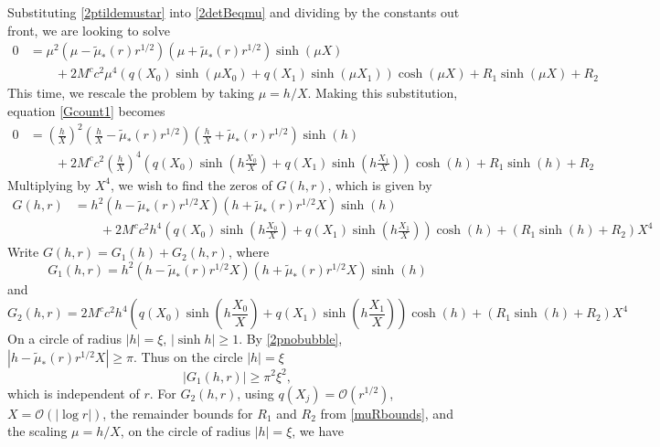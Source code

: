 \documentclass[thesis.tex]{subfiles}
\begin{document}
Substituting \cref{2ptildemustar} into \cref{2detBeqmu} and dividing by the constants out front, we are looking to solve
\begin{equation}\label{Gcount1}
\begin{aligned}
0 &= \mu^2 (\mu - \tilde{\mu}_*(r)r^{1/2}) (\mu + \tilde{\mu}_*(r)r^{1/2}) \sinh(\mu X) \\
&\qquad +2 M^c c^2 \mu^4 ( q(X_0) \sinh(\mu X_0) + q(X_1) \sinh(\mu X_1) ) \cosh(\mu X) + R_1\sinh(\mu X) + R_2
\end{aligned}
\end{equation}
This time, we rescale the problem by taking $\mu = h/X$. Making this substitution, equation \cref{Gcount1} becomes
\begin{equation}\label{Gcount2}
\begin{aligned}
0 &= \left(\frac{h}{X}\right)^2 \left( \frac{h}{X} - \tilde{\mu}_*(r)r^{1/2}\right)\left(\frac{h}{X} + \tilde{\mu}_*(r)r^{1/2}\right) \sinh(h) \\
&\qquad +2 M^c c^2 \left(\frac{h}{X}\right)^4 \left( q(X_0) \sinh\left(h \frac{X_0}{X} \right) + q(X_1) \sinh\left(h \frac{X_1}{X} \right) \right) \cosh(h) + R_1\sinh(h) + R_2
\end{aligned}
\end{equation}
Multiplying by $X^4$, we wish to find the zeros of $G(h, r)$, which is given by
\begin{equation}\label{Gcount3}
\begin{aligned}
G(h,r) &= h^2 \left( h - \tilde{\mu}_*(r)r^{1/2}X\right)\left(h + \tilde{\mu}_*(r)r^{1/2}X\right) \sinh(h) \\
&\qquad +2 M^c c^2 h^4 \left( q(X_0) \sinh\left(h \frac{X_0}{X} \right) + q(X_1) \sinh\left(h \frac{X_1}{X} \right) \right) \cosh(h) + (R_1\sinh(h) + R_2)X^4
\end{aligned}
\end{equation}
Write $G(h,r) = G_1(h) + G_2(h,r)$, where
\[
G_1(h, r) = h^2 \left( h - \tilde{\mu}_*(r)r^{1/2}X\right)\left(h + \tilde{\mu}_*(r)r^{1/2}X\right) \sinh(h)
\]
and
\[
G_2(h,r) = 2 M^c c^2 h^4 \left( q(X_0) \sinh\left(h \frac{X_0}{X} \right) + q(X_1) \sinh\left(h \frac{X_1}{X} \right) \right) \cosh(h) + (R_1\sinh(h) + R_2)X^4
\]
On a circle of radius $|h| = \xi$, $|\sinh h| \geq 1$. By \cref{2pnobubble}, $|h - \tilde{\mu}_*(r)r^{1/2}X|\geq \pi$. Thus on the circle $|h| = \xi$
\[
|G_1(h,r)| \geq \pi^2 \xi^2,
\]
which is independent of $r$. For $G_2(h,r)$, using $q(X_j) = \mathcal{O}(r^{1/2})$, $X = \mathcal{O}(|\log r|)$, the remainder bounds for $R_1$ and $R_2$ from \cref{muRbounds}, and the scaling $\mu = h/X$, on the circle of radius $|h| = \xi$, we have
\end{document}
